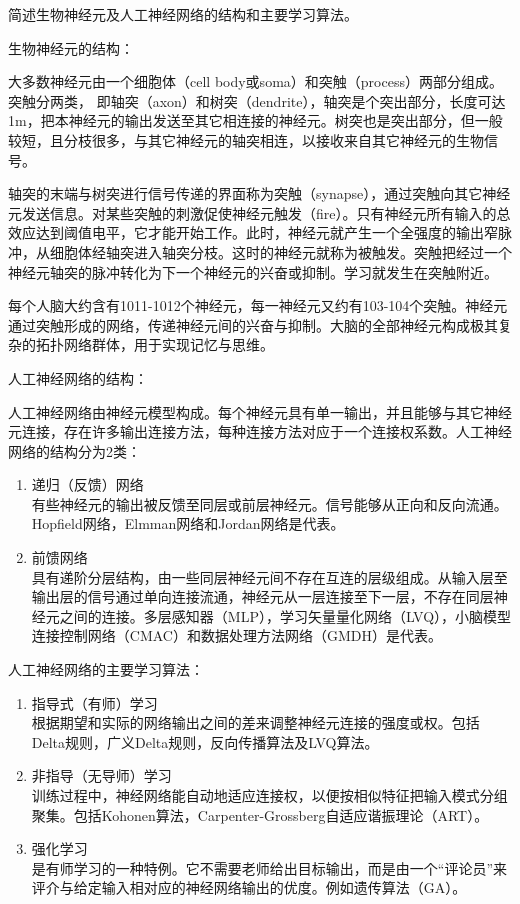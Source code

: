 \begin{question}
简述生物神经元及人工神经网络的结构和主要学习算法。
\end{question}
\begin{solution}
生物神经元的结构：\par
大多数神经元由一个细胞体（cell body或soma）和突触（process）两部分组成。突触分两类， 即轴突（axon）和树突（dendrite），轴突是个突出部分，长度可达1m，把本神经元的输出发送至其它相连接的神经元。树突也是突出部分，但一般较短，且分枝很多，与其它神经元的轴突相连，以接收来自其它神经元的生物信号。\par
轴突的末端与树突进行信号传递的界面称为突触（synapse），通过突触向其它神经元发送信息。对某些突触的刺激促使神经元触发（fire）。只有神经元所有输入的总效应达到阈值电平，它才能开始工作。此时，神经元就产生一个全强度的输出窄脉冲，从细胞体经轴突进入轴突分枝。这时的神经元就称为被触发。突触把经过一个神经元轴突的脉冲转化为下一个神经元的兴奋或抑制。学习就发生在突触附近。\par
每个人脑大约含有1011-1012个神经元，每一神经元又约有103-104个突触。神经元通过突触形成的网络，传递神经元间的兴奋与抑制。大脑的全部神经元构成极其复杂的拓扑网络群体，用于实现记忆与思维。\par
人工神经网络的结构：\par
人工神经网络由神经元模型构成。每个神经元具有单一输出，并且能够与其它神经元连接，存在许多输出连接方法，每种连接方法对应于一个连接权系数。人工神经网络的结构分为2类：
	\begin{enumerate}
	\item 递归（反馈）网络 \\
有些神经元的输出被反馈至同层或前层神经元。信号能够从正向和反向流通。Hopfield网络，Elmman网络和Jordan网络是代表。 
	\item 前馈网络 \\
具有递阶分层结构，由一些同层神经元间不存在互连的层级组成。从输入层至输出层的信号通过单向连接流通，神经元从一层连接至下一层，不存在同层神经元之间的连接。多层感知器（MLP），学习矢量量化网络（LVQ），小脑模型连接控制网络（CMAC）和数据处理方法网络（GMDH）是代表。
	\end{enumerate} \par
人工神经网络的主要学习算法：
	\begin{enumerate}
	\item 指导式（有师）学习 \\
根据期望和实际的网络输出之间的差来调整神经元连接的强度或权。包括Delta规则，广义Delta规则，反向传播算法及LVQ算法。 
	\item 非指导（无导师）学习 \\
训练过程中，神经网络能自动地适应连接权，以便按相似特征把输入模式分组聚集。包括Kohonen算法，Carpenter-Grossberg自适应谐振理论（ART）。 
	\item 强化学习 \\
是有师学习的一种特例。它不需要老师给出目标输出，而是由一个“评论员”来评介与给定输入相对应的神经网络输出的优度。例如遗传算法（GA）。  
	\end{enumerate}	 
\end{solution}

